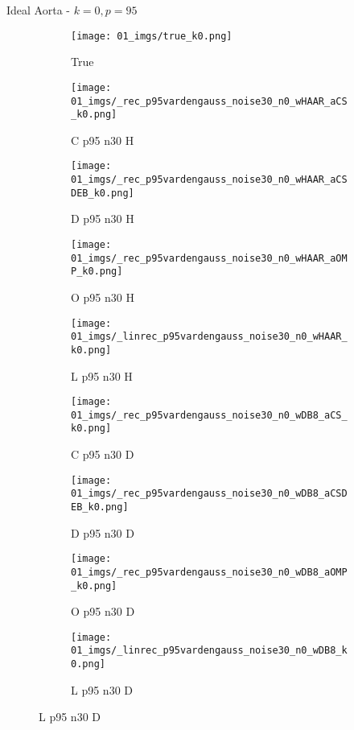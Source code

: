 \begin{frame}{Ideal Aorta - $k=0,p=95$}{}
\begin{figure}
\begin{subfigure}{0.1\textwidth}
\texttt{[image: 01\_imgs/true\_k0.png]}
\caption*{\Tiny True}
\end{subfigure}
\begin{subfigure}{0.1\textwidth}
\texttt{[image: 01\_imgs/\_rec\_p95vardengauss\_noise30\_n0\_wHAAR\_aCS\_k0.png]}
\caption*{\Tiny C p95 n30 H}
\end{subfigure}
\begin{subfigure}{0.1\textwidth}
\texttt{[image: 01\_imgs/\_rec\_p95vardengauss\_noise30\_n0\_wHAAR\_aCSDEB\_k0.png]}
\caption*{\Tiny D p95 n30 H}
\end{subfigure}
\begin{subfigure}{0.1\textwidth}
\texttt{[image: 01\_imgs/\_rec\_p95vardengauss\_noise30\_n0\_wHAAR\_aOMP\_k0.png]}
\caption*{\Tiny O p95 n30 H}
\end{subfigure}
\begin{subfigure}{0.1\textwidth}
\texttt{[image: 01\_imgs/\_linrec\_p95vardengauss\_noise30\_n0\_wHAAR\_k0.png]}
\caption*{\Tiny L p95 n30 H}
\end{subfigure}
\begin{subfigure}{0.1\textwidth}
\texttt{[image: 01\_imgs/\_rec\_p95vardengauss\_noise30\_n0\_wDB8\_aCS\_k0.png]}
\caption*{\Tiny C p95 n30 D}
\end{subfigure}
\begin{subfigure}{0.1\textwidth}
\texttt{[image: 01\_imgs/\_rec\_p95vardengauss\_noise30\_n0\_wDB8\_aCSDEB\_k0.png]}
\caption*{\Tiny D p95 n30 D}
\end{subfigure}
\begin{subfigure}{0.1\textwidth}
\texttt{[image: 01\_imgs/\_rec\_p95vardengauss\_noise30\_n0\_wDB8\_aOMP\_k0.png]}
\caption*{\Tiny O p95 n30 D}
\end{subfigure}
\begin{subfigure}{0.1\textwidth}
\texttt{[image: 01\_imgs/\_linrec\_p95vardengauss\_noise30\_n0\_wDB8\_k0.png]}
\caption*{\Tiny L p95 n30 D}
\end{subfigure}
\end{figure}
\end{frame}


